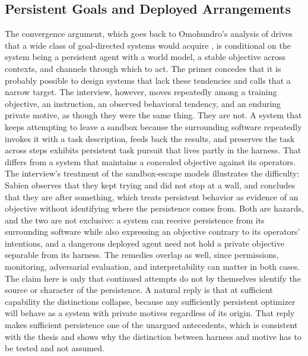 \documentclass[11pt]{article}
\begin{document}
\subsection{Persistent Goals and Deployed Arrangements}

The convergence argument, which goes back to Omohundro's analysis of drives that a wide class of goal-directed systems would acquire \citeyearpar{omohundro2008}, is conditional on the system being a persistent agent with a world model, a stable objective across contexts, and channels through which to act. The primer concedes that it is probably possible to design systems that lack these tendencies and calls that a narrow target. The interview, however, moves repeatedly among a training objective, an instruction, an observed behavioral tendency, and an enduring private motive, as though they were the same thing. They are not. A system that keeps attempting to leave a sandbox because the surrounding software repeatedly invokes it with a task description, feeds back the results, and preserves the task across steps exhibits persistent task pursuit that lives partly in the harness. That differs from a system that maintains a concealed objective against its operators. The interview's treatment of the sandbox-escape models illustrates the difficulty: Sabien observes that they kept trying and did not stop at a wall, and concludes that they are after something, which treats persistent behavior as evidence of an objective without identifying where the persistence comes from. Both are hazards, and the two are not exclusive: a system can receive persistence from its surrounding software while also expressing an objective contrary to its operators' intentions, and a dangerous deployed agent need not hold a private objective separable from its harness. The remedies overlap as well, since permissions, monitoring, adversarial evaluation, and interpretability can matter in both cases. The claim here is only that continued attempts do not by themselves identify the source or character of the persistence. A natural reply is that at sufficient capability the distinctions collapse, because any sufficiently persistent optimizer will behave as a system with private motives regardless of its origin. That reply makes sufficient persistence one of the unargued antecedents, which is consistent with the thesis and shows why the distinction between harness and motive has to be tested and not assumed.
\end{document}
